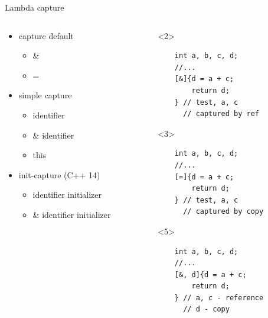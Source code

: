 \documentclass[10pt]{beamer}
\begin{document}
\begin{frame}[fragile]{Lambda capture}

	\begin{columns}
		\begin{column}{0.37\linewidth}
		\begin{itemize}[<+- |alert@+>]
		\item capture default
			\begin{itemize}
				\item \&
				\item =
			\end{itemize}
		\item simple capture
			\begin{itemize}
				\item identifier
				\item \& identifier
				\item this
			\end{itemize}
		\item init-capture \footnotesize (C++ 14)
			\begin{itemize}
				\item identifier initializer
				\item \& identifier initializer
			\end{itemize}	
	\end{itemize}
		\end{column}
		\vrule
		\begin{column}{0.6\linewidth}
			\begin{onlyenv}<2>
				\begin{verbatim}
    int a, b, c, d;
    //...
    [&]{d = a + c;
        return d;
    } // test, a, c
      // captured by ref 
				\end{verbatim}
			\end{onlyenv}
			\begin{onlyenv}<3>
				\begin{verbatim}
    int a, b, c, d;
    //...
    [=]{d = a + c;
        return d;
    } // test, a, c
      // captured by copy 
				\end{verbatim}
			\end{onlyenv}
			\begin{onlyenv}<5>
				\begin{verbatim}
    int a, b, c, d;
    //...
    [&, d]{d = a + c;
        return d;
    } // a, c - reference
      // d - copy 
				\end{verbatim}
			\end{onlyenv}

\end{column}
\end{columns}
\end{frame}
\end{document}
